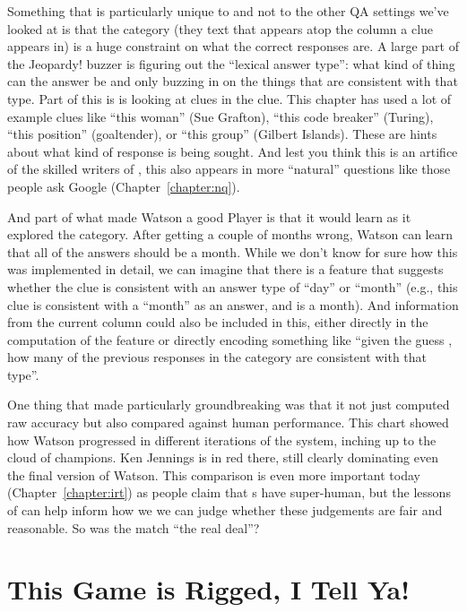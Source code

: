 Something that is particularly unique to \jeopardy{} and not to the
other QA settings we’ve looked at is that the category (they text that appears
atop the column a clue appears in) is a huge
constraint on what the correct responses are.
%
A large part of the
Jeopardy! buzzer is figuring out the ``lexical answer type'': what kind of
thing can the answer be and only buzzing in on the things that are consistent
with that type.
%
Part of
this is is looking at clues in the clue.
%
This chapter has used a lot of example clues like ``this woman'' (Sue
Grafton), ``this code breaker'' (Turing), ``this position'' (goaltender), or
``this group'' (Gilbert Islands).
%
These are hints about what kind of response is being sought.
%
And lest you think this is an artifice of the skilled writers of \jeopardy{},
this also appears in more ``natural'' questions like those people ask Google
(Chapter~\ref{chapter:nq}).

And part of what made Watson a good \jeopardy{} Player is that it would learn
as it explored the category.
%
After getting a couple of months wrong, Watson
can learn that all of the answers should be a month.
%
While we don't know for sure how this was implemented in detail, we can
imagine that there is a feature that suggests whether the clue is consistent
with an answer type of ``day'' or ``month'' (e.g., this clue is consistent
with a ``month'' as an answer, and  is a month).
%
And information from the current column could also be included in this, either
directly in the computation of the feature or directly encoding something like
``given the guess , how many of the previous responses in the
category are consistent with that type''.

One thing that made \watson{} particularly groundbreaking was that it not just
computed raw accuracy but also compared against human performance.
%
This chart showed how Watson progressed in different iterations of the system,
inching up to the cloud of \jeopardy{} champions.  Ken Jennings is in red there,
still clearly dominating even the final version of Watson.
%
This comparison is even more important today (Chapter~\ref{chapter:irt}) as people claim that s
have super-human, but the lessons of \watson{} can
help inform how we we can judge whether these judgements are fair and
reasonable.
%
So was the \watson{} match ``the real deal''?

\section{This Game is Rigged, I Tell Ya!}

